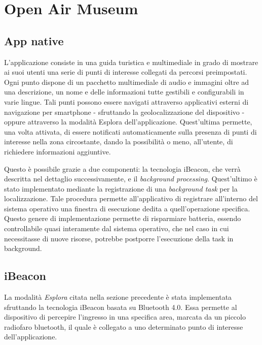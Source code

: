 \chapter{Open Air Museum} %
\label{Open Air Museum}

\vspace{5mm}

\section{App native}\vspace{5mm}

L’applicazione consiste in una guida turistica e multimediale in grado di mostrare ai suoi utenti una serie di punti di interesse collegati da percorsi preimpostati. Ogni punto dispone di un pacchetto multimediale di audio e immagini oltre ad una descrizione, un nome e delle informazioni tutte gestibili e configurabili in varie lingue. Tali punti possono essere navigati attraverso applicativi esterni di navigazione per smartphone - sfruttando la geolocalizzazione del dispositivo - oppure attraverso la modalità Esplora dell’applicazione. Quest'ultima permette, una volta attivata, di essere notificati automaticamente sulla presenza di punti di interesse nella zona circostante, dando la possibilità o meno, all’utente, di richiedere informazioni aggiuntive. \vspace{5mm}

Questo è possibile grazie a due componenti: la tecnologia iBeacon\cite{iBeacon}, che verrà descritta nel dettaglio successivamente, e il \emph{background processing}. Quest'ultimo è stato implementato mediante la registrazione di una \emph{background task} per la localizzazione. Tale procedura permette all'applicativo di registrare all'interno del sistema operativo una finestra di esecuzione dedita a quell'operazione specifica. Questo genere di implementazione permette di risparmiare batteria, essendo controllabile quasi interamente dal sistema operativo, che nel caso in cui necessitasse di nuove risorse, potrebbe postporre l'esecuzione della task in background.

\section{iBeacon}\vspace{5mm}

La modalità \emph{Esplora} citata nella sezione precedente è stata implementata sfruttando la tecnologia iBeacon basata su Bluetooth 4.0\cite{Bluetooth}. Essa permette al dispositivo di percepire l’ingresso in una specifica area, marcata da un piccolo radiofaro bluetooth, il quale è collegato a uno determinato punto di interesse dell'applicazione.\vspace{5mm}

